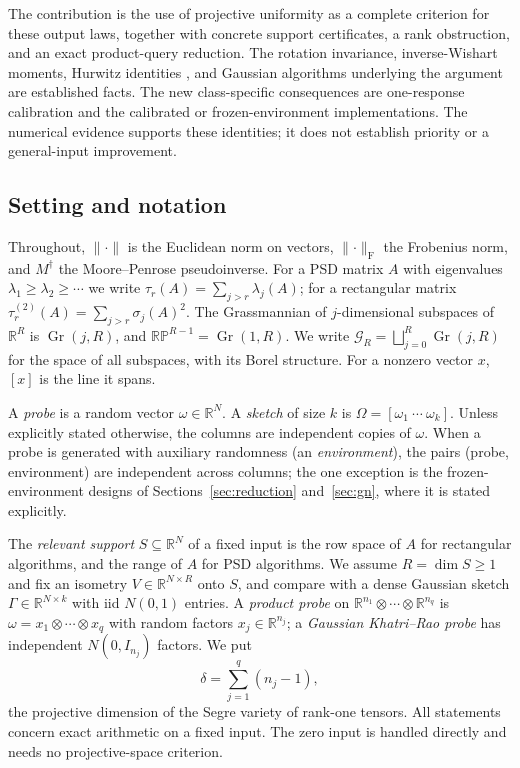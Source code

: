 \documentclass[11pt,a4paper]{article}
\theoremstyle{definition}
\theoremstyle{remark}
\numberwithin{equation}{section}
\newcommand{\R}{\mathbb R}
\newcommand{\Gr}{\operatorname{Gr}}
\newcommand{\RP}{\mathbb{RP}}
\newcommand{\norm}[1]{\lVert#1\rVert}
\newcommand{\F}{\mathrm F}
\begin{document}
The contribution is the use of projective uniformity as a complete criterion
for these output laws, together with concrete support certificates, a rank
obstruction, and an exact product-query reduction. The rotation invariance,
inverse-Wishart moments, Hurwitz identities \cite{LMO}, and Gaussian
algorithms underlying the argument are established facts. The new
class-specific consequences are one-response calibration and the calibrated
or frozen-environment implementations. The numerical evidence supports these
identities; it does not establish priority or a general-input improvement.

\subsection{Setting and notation}

Throughout, $\norm\cdot$ is the Euclidean norm on vectors, $\norm\cdot_\F$ the
Frobenius norm, and $M^\dagger$ the Moore--Penrose pseudoinverse. For a PSD
matrix $A$ with eigenvalues $\lambda_1\ge\lambda_2\ge\cdots$ we write
$\tau_r(A)=\sum_{j>r}\lambda_j(A)$; for a rectangular matrix
$\tau^{(2)}_r(A)=\sum_{j>r}\sigma_j(A)^2$. The Grassmannian of $j$-dimensional
subspaces of $\R^R$ is $\Gr(j,R)$, and $\RP^{R-1}=\Gr(1,R)$. We write
$\mathcal G_R=\bigsqcup_{j=0}^R\Gr(j,R)$ for the space of all subspaces, with
its Borel structure. For a nonzero vector $x$, $[x]$ is the line it spans.

A \emph{probe} is a random vector $\omega\in\R^N$. A \emph{sketch} of size $k$
is $\Omega=[\omega_1\ \cdots\ \omega_k]$. Unless explicitly stated
otherwise, the columns are independent copies of $\omega$. When a probe is
generated with auxiliary randomness (an \emph{environment}), the pairs
(probe, environment) are independent across columns; the one exception is the
frozen-environment designs of Sections~\ref{sec:reduction}
and~\ref{sec:gn}, where it is stated explicitly.

The \emph{relevant support} $S\subseteq\R^N$ of a fixed input is the row space
of $A$ for rectangular algorithms, and the range of $A$ for PSD algorithms.
We assume $R=\dim S\ge1$ and fix an isometry $V\in\R^{N\times R}$ onto $S$, and
compare with a dense Gaussian sketch $\Gamma\in\R^{N\times k}$ with iid
$N(0,1)$ entries. A \emph{product probe} on
$\R^{n_1}\otimes\cdots\otimes\R^{n_q}$ is
$\omega=x_1\otimes\cdots\otimes x_q$ with random factors $x_j\in\R^{n_j}$; a
\emph{Gaussian Khatri--Rao probe} has independent $N(0,I_{n_j})$ factors. We put
\[
 \delta=\sum_{j=1}^q(n_j-1),
\]
the projective dimension of the Segre variety of rank-one tensors.
All statements concern exact arithmetic on a fixed input. The zero input is
handled directly and needs no projective-space criterion.
\end{document}
